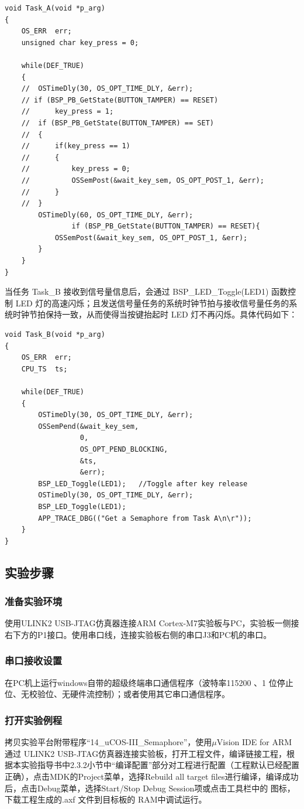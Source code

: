 ﻿\documentclass[UTF8,12pt]{article}
\begin{document}
\begin{lstlisting}[frame=shadowbox]
void Task_A(void *p_arg)
{	   
	OS_ERR  err;
	unsigned char key_press = 0;

	while(DEF_TRUE)
	{
	// 	OSTimeDly(30, OS_OPT_TIME_DLY, &err);
    // if (BSP_PB_GetState(BUTTON_TAMPER) == RESET)
	// 		key_press = 1;
	// 	if (BSP_PB_GetState(BUTTON_TAMPER) == SET)
	// 	{
	// 		if(key_press == 1)
	// 		{
	// 			key_press = 0;
	// 			OSSemPost(&wait_key_sem, OS_OPT_POST_1, &err);
	// 		}
	// 	}	
        OSTimeDly(60, OS_OPT_TIME_DLY, &err);
				if (BSP_PB_GetState(BUTTON_TAMPER) == RESET){
            OSSemPost(&wait_key_sem, OS_OPT_POST_1, &err);
        }
	}
}
\end{lstlisting}
当任务 Task\_B 接收到信号量信息后，会通过 BSP\_LED\_Toggle(LED1) 函数控制 LED 灯的高速闪烁；且发送信号量任务的系统时钟节拍与接收信号量任务的系统时钟节拍保持一致，从而使得当按键抬起时 LED 灯不再闪烁。具体代码如下：

\begin{lstlisting}[frame=shadowbox]
void Task_B(void *p_arg)
{			  
	OS_ERR  err;
	CPU_TS  ts;

	while(DEF_TRUE)
	{
		OSTimeDly(30, OS_OPT_TIME_DLY, &err);
		OSSemPend(&wait_key_sem,
                  0,
                  OS_OPT_PEND_BLOCKING,
                  &ts,
                  &err);
		BSP_LED_Toggle(LED1);	//Toggle after key release
        OSTimeDly(30, OS_OPT_TIME_DLY, &err);
        BSP_LED_Toggle(LED1);
		APP_TRACE_DBG(("Get a Semaphore from Task A\n\r"));
	}
}
\end{lstlisting}

\subsection{实验步骤}
\subsubsection{准备实验环境}
使用ULINK2 USB-JTAG仿真器连接ARM Cortex-M7实验板与PC，实验板一侧接右下方的P1接口。使用串口线，连接实验板右侧的串口J3和PC机的串口。

\subsubsection{串口接收设置}
在PC机上运行windows自带的超级终端串口通信程序（波特率115200 、1 位停止位、无校验位、无硬件流控制）；或者使用其它串口通信程序。

\subsubsection{打开实验例程}
拷贝实验平台附带程序“14\_uCOS-III\_Semaphore”，使用$\mu$Vision IDE for ARM通过 ULINK2 USB-JTAG仿真器连接实验板，打开工程文件，编译链接工程，根据本实验指导书中2.3.2小节中“编译配置”部分对工程进行配置（工程默认已经配置正确），点击MDK的Project菜单，选择Rebuild all target files进行编译，编译成功后，点击Debug菜单，选择Start/Stop Debug Session项或点击工具栏中的 图标，下载工程生成的.axf 文件到目标板的 RAM中调试运行。
\end{document}
